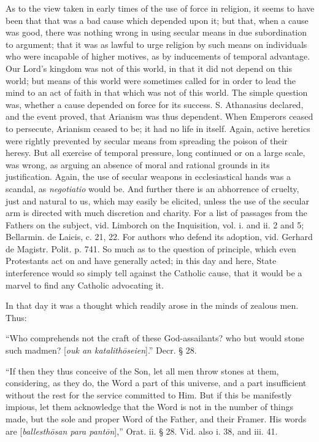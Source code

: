 As to the view taken in early times of the use of
force in religion, it seems to have been that that was a bad cause
which depended upon it; but that, when a cause was good, there was
nothing wrong in using secular means in due subordination to
argument; that it was as lawful to urge religion by such means on
individuals who were incapable of higher motives, as by inducements of
temporal advantage. Our Lord's kingdom was not of this world, in that
it did not depend on this world; but means of this world were
sometimes called for in order to lead the mind to an act of faith in
that which was not of this world. The simple question was, whether a
cause depended on force for its success. S. Athanasius declared, and
the event proved, that Arianism was thus dependent. When Emperors
ceased to persecute, Arianism ceased to be; it had no life in itself.
Again, active heretics were rightly prevented by secular means from
spreading the poison of their heresy. But all exercise of temporal
pressure, long continued or on a large scale, was wrong, as arguing an
absence of moral and rational grounds in its justification. Again, the
use of secular weapons in ecclesiastical hands was a scandal, as \emph{negotiatio} would be. And further there is an abhorrence of cruelty,
just and natural to us, which may easily be elicited, unless the use
of the secular arm is directed with much discretion and charity. For a
list of passages from the Fathers on the subject, vid. Limborch on the
Inquisition, vol. i. and ii. 2 and
5; Bellarmin. de Laicis, c. 21, 22. For authors who defend its
adoption, vid. Gerhard de Magistr. Polit. p. 741. So much as to the
question of principle, which even Protestants act on and have
generally acted; in this day and here, State interference would so
simply tell against the Catholic cause, that it would be a marvel to
find any Catholic advocating it.

In that day it was a thought which readily arose
in the minds of zealous men. Thus:

``Who comprehends not the craft of these
God-assailants? who but would stone such madmen? [\emph{ouk an katalith\={o}seien}].''
Decr. § 28.

``If then they thus conceive of the Son, let all
men throw stones at them, considering, as they do, the Word a part of
this universe, and a part insufficient without the rest for the
service committed to Him. But if this be manifestly impious, let them
acknowledge that the Word is not in the number of things made, but the
sole and proper Word of the Father, and their Framer. His words are [\emph{ballesth\={o}san
para pant\={o}n}],''
Orat. ii. § 28. Vid. also i. 38, and iii. 41.

